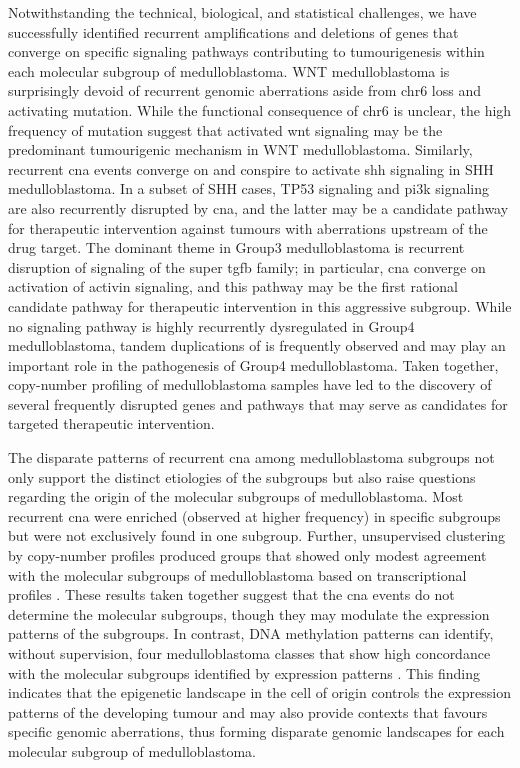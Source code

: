 Notwithstanding the technical, biological, and statistical challenges, we have successfully identified recurrent amplifications and deletions of genes that converge on specific signaling pathways contributing to tumourigenesis within each molecular subgroup of medulloblastoma. WNT medulloblastoma is surprisingly devoid of recurrent genomic aberrations aside from chr6 loss and  activating mutation. While the functional consequence of chr6 is unclear, the high frequency of  mutation suggest that activated \gls{wnt} signaling may be the predominant tumourigenic mechanism in WNT medulloblastoma. Similarly, recurrent \gls{cna} events converge on and conspire to activate \gls{shh} signaling in SHH medulloblastoma. In a subset of SHH cases, TP53 signaling and \gls{pi3k} signaling are also recurrently disrupted by \gls{cna}, and the latter may be a candidate pathway for therapeutic intervention against tumours with aberrations upstream of the drug target. The dominant theme in Group3 medulloblastoma is recurrent disruption of signaling of the super \gls{tgfb} family; in particular, \gls{cna} converge on activation of activin signaling, and this pathway may be the first rational candidate pathway for therapeutic intervention in this aggressive subgroup. While no signaling pathway is highly recurrently dysregulated in Group4 medulloblastoma, tandem duplications of  is frequently observed and may play an important role in the pathogenesis of Group4 medulloblastoma. Taken together, copy-number profiling of medulloblastoma samples have led to the discovery of several frequently disrupted genes and pathways that may serve as candidates for targeted therapeutic intervention.

The disparate patterns of recurrent \gls{cna} among medulloblastoma subgroups not only support the distinct etiologies of the subgroups but also raise questions regarding the origin of the molecular subgroups of medulloblastoma. Most recurrent \gls{cna} were enriched (observed at higher frequency) in specific subgroups but were not exclusively found in one subgroup. Further, unsupervised clustering by copy-number profiles produced groups that showed only modest agreement with the molecular subgroups of medulloblastoma based on transcriptional profiles . These results taken together suggest that the \gls{cna} events do not determine the molecular subgroups, though they may modulate the expression patterns of the subgroups. In contrast, DNA methylation patterns can identify, without supervision, four medulloblastoma classes that show high concordance with the molecular subgroups identified by expression patterns . This finding indicates that the epigenetic landscape in the cell of origin controls the expression patterns of the developing tumour and may also provide contexts that favours specific genomic aberrations, thus forming disparate genomic landscapes for each molecular subgroup of medulloblastoma.


